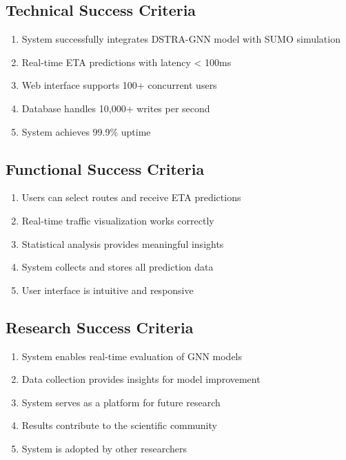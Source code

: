 \documentclass[12pt,a4paper]{article}
\begin{document}
\subsection{Technical Success Criteria}

\begin{enumerate}
    \item System successfully integrates DSTRA-GNN model with SUMO simulation
    \item Real-time ETA predictions with latency < 100ms
    \item Web interface supports 100+ concurrent users
    \item Database handles 10,000+ writes per second
    \item System achieves 99.9\% uptime
\end{enumerate}

\subsection{Functional Success Criteria}

\begin{enumerate}
    \item Users can select routes and receive ETA predictions
    \item Real-time traffic visualization works correctly
    \item Statistical analysis provides meaningful insights
    \item System collects and stores all prediction data
    \item User interface is intuitive and responsive
\end{enumerate}

\subsection{Research Success Criteria}

\begin{enumerate}
    \item System enables real-time evaluation of GNN models
    \item Data collection provides insights for model improvement
    \item System serves as a platform for future research
    \item Results contribute to the scientific community
    \item System is adopted by other researchers
\end{enumerate}
\end{document}
